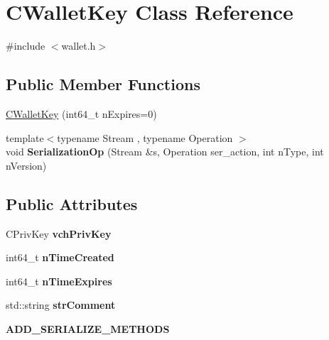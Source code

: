 \hypertarget{class_c_wallet_key}{}\section{C\+Wallet\+Key Class Reference}
\label{class_c_wallet_key}


{\ttfamily \#include $<$wallet.\+h$>$}

\subsection*{Public Member Functions}
\begin{DoxyCompactItemize}
\item 
\mbox{\hyperlink{class_c_wallet_key_aa2603825b543b1d5153f31482139a6b2}{C\+Wallet\+Key}} (int64\+\_\+t n\+Expires=0)
\item 
\mbox{\label{class_c_wallet_key_aa91831d60fc789bddcd7ea7339fef316}} 
{\footnotesize template$<$typename Stream , typename Operation $>$ }\\void {\bfseries Serialization\+Op} (Stream \&s, Operation ser\+\_\+action, int n\+Type, int n\+Version)
\end{DoxyCompactItemize}
\subsection*{Public Attributes}
\begin{DoxyCompactItemize}
\item 
\mbox{\label{class_c_wallet_key_a28f9bbffcc9d7f2f784d5e4be8ca31f7}} 
C\+Priv\+Key {\bfseries vch\+Priv\+Key}
\item 
\mbox{\label{class_c_wallet_key_a08e4bb5bbb690f478e3f464fdc6f26c2}} 
int64\+\_\+t {\bfseries n\+Time\+Created}
\item 
\mbox{\label{class_c_wallet_key_a53b6c0e78341dae728724a35dc88e258}} 
int64\+\_\+t {\bfseries n\+Time\+Expires}
\item 
\mbox{\label{class_c_wallet_key_aa8804f64837126c6a28c27178eb8c220}} 
std\+::string {\bfseries str\+Comment}
\item 
\mbox{\label{class_c_wallet_key_a1ad8fb86fc19f29db785a471d772ed3b}} 
{\bfseries A\+D\+D\+\_\+\+S\+E\+R\+I\+A\+L\+I\+Z\+E\+\_\+\+M\+E\+T\+H\+O\+DS}
\end{DoxyCompactItemize}


